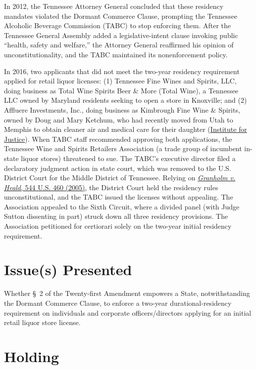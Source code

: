 \documentclass[12pt]{article}
\begin{document}
In 2012, the Tennessee Attorney General concluded that these residency mandates violated the Dormant Commerce Clause, prompting the Tennessee Alcoholic Beverage Commission (TABC) to stop enforcing them. After the Tennessee General Assembly added a legislative-intent clause invoking public ``health, safety and welfare,'' the Attorney General reaffirmed his opinion of unconstitutionality, and the TABC maintained its nonenforcement policy.

In 2016, two applicants that did not meet the two-year residency requirement applied for retail liquor licenses: (1) Tennessee Fine Wines and Spirits, LLC, doing business as Total Wine Spirits Beer \& More (Total Wine), a Tennessee LLC owned by Maryland residents seeking to open a store in Knoxville; and (2) Affluere Investments, Inc., doing business as Kimbrough Fine Wine \& Spirits, owned by Doug and Mary Ketchum, who had recently moved from Utah to Memphis to obtain cleaner air and medical care for their daughter (\href{https://ij.org/case/tennessee-wine-and-spirits-retailers-association-v-thomas/}{Institute for Justice}). When TABC staff recommended approving both applications, the Tennessee Wine and Spirits Retailers Association (a trade group of incumbent in-state liquor stores) threatened to sue. The TABC's executive director filed a declaratory judgment action in state court, which was removed to the U.S. District Court for the Middle District of Tennessee. Relying on \href{https://supreme.justia.com/cases/federal/us/544/460/}{\textit{Granholm v. Heald}, 544 U.S. 460 (2005)}, the District Court held the residency rules unconstitutional, and the TABC issued the licenses without appealing. The Association appealed to the Sixth Circuit, where a divided panel (with Judge Sutton dissenting in part) struck down all three residency provisions. The Association petitioned for certiorari solely on the two-year initial residency requirement.

\section{Issue(s) Presented}

Whether \S~2 of the Twenty-first Amendment empowers a State, notwithstanding the Dormant Commerce Clause, to enforce a two-year durational-residency requirement on individuals and corporate officers/directors applying for an initial retail liquor store license.

\section{Holding}
\end{document}
